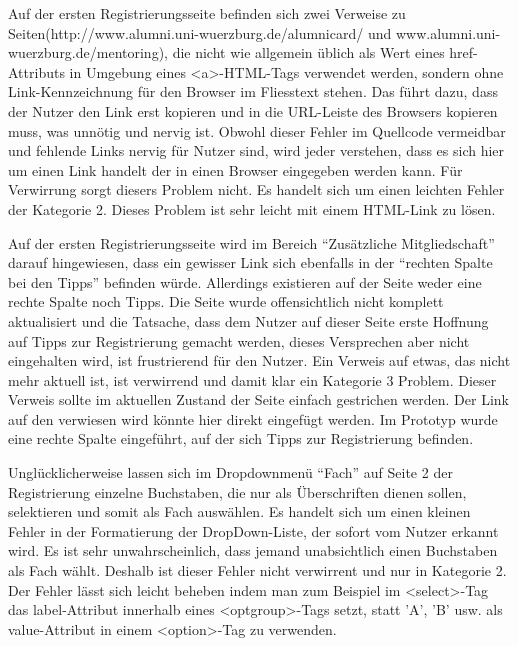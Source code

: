 {Auf der ersten Registrierungsseite befinden sich zwei Verweise zu Seiten(http://www.alumni.uni-wuerzburg.de/alumnicard/  und www.alumni.uni-wuerzburg.de/mentoring), die nicht wie allgemein üblich als Wert eines href-Attributs in Umgebung eines <a>-HTML-Tags verwendet werden, sondern ohne Link-Kennzeichnung für den Browser im Fliesstext stehen. Das führt dazu, dass der Nutzer den Link erst kopieren und in die URL-Leiste des Browsers kopieren muss, was unnötig und nervig ist.
}
{Obwohl dieser Fehler im Quellcode vermeidbar und fehlende Links nervig für Nutzer sind, wird jeder verstehen, dass es sich hier um einen Link handelt der in einen Browser eingegeben werden kann. Für Verwirrung sorgt diesers Problem nicht. Es handelt sich um einen leichten Fehler der Kategorie 2.
}
{Dieses Problem ist sehr leicht mit einem HTML-Link zu lösen.
} 

{Auf der ersten Registrierungsseite wird im Bereich “Zusätzliche Mitgliedschaft” darauf hingewiesen, dass ein gewisser Link sich ebenfalls in der “rechten Spalte bei den Tipps”  befinden würde. Allerdings existieren auf der Seite weder eine rechte Spalte noch Tipps. Die Seite wurde offensichtlich nicht komplett aktualisiert und die Tatsache, dass dem Nutzer auf dieser Seite erste Hoffnung auf Tipps zur Registrierung gemacht werden, dieses Versprechen aber nicht eingehalten wird, ist frustrierend für den Nutzer.
}
{Ein Verweis auf etwas, das nicht mehr aktuell ist, ist verwirrend und damit klar ein Kategorie 3 Problem.
}
{Dieser Verweis sollte im aktuellen Zustand der Seite einfach gestrichen werden. Der Link auf den verwiesen wird könnte hier direkt eingefügt werden. Im Prototyp wurde eine rechte Spalte eingeführt, auf der sich Tipps zur Registrierung befinden.
} 

{Unglücklicherweise lassen sich im Dropdownmenü “Fach” auf Seite 2 der Registrierung einzelne Buchstaben, die nur als Überschriften dienen sollen, selektieren und somit als Fach auswählen. 
}
{Es handelt sich um einen kleinen Fehler in der Formatierung der DropDown-Liste, der sofort vom Nutzer erkannt wird. Es ist sehr unwahrscheinlich, dass jemand unabsichtlich einen Buchstaben als Fach wählt. Deshalb ist dieser Fehler nicht verwirrent und nur in Kategorie 2.
}
{Der Fehler lässt sich leicht beheben indem man zum Beispiel im <select>-Tag das label-Attribut innerhalb eines <optgroup>-Tags setzt, statt 'A', 'B' usw. als value-Attribut in einem <option>-Tag zu verwenden.
} 



